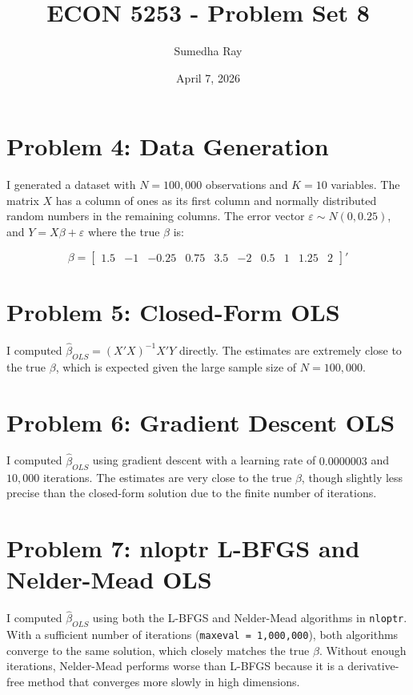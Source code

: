 \documentclass{article}
\title{ECON 5253 - Problem Set 8}
\author{Sumedha Ray}
\date{April 7, 2026}
\begin{document}
\maketitle

\section*{Problem 4: Data Generation}

I generated a dataset with $N = 100{,}000$ observations and $K = 10$ variables. The matrix $X$ has a column of ones as its first column and normally distributed random numbers in the remaining columns. The error vector $\varepsilon \sim N(0, 0.25)$, and $Y = X\beta + \varepsilon$ where the true $\beta$ is:

\[
\beta = \begin{bmatrix} 1.5 & -1 & -0.25 & 0.75 & 3.5 & -2 & 0.5 & 1 & 1.25 & 2 \end{bmatrix}'
\]

\section*{Problem 5: Closed-Form OLS}

I computed $\hat{\beta}_{OLS} = (X'X)^{-1}X'Y$ directly. The estimates are extremely close to the true $\beta$, which is expected given the large sample size of $N = 100{,}000$.

\section*{Problem 6: Gradient Descent OLS}

I computed $\hat{\beta}_{OLS}$ using gradient descent with a learning rate of $0.0000003$ and $10{,}000$ iterations. The estimates are very close to the true $\beta$, though slightly less precise than the closed-form solution due to the finite number of iterations.

\section*{Problem 7: nloptr L-BFGS and Nelder-Mead OLS}

I computed $\hat{\beta}_{OLS}$ using both the L-BFGS and Nelder-Mead algorithms in \texttt{nloptr}. With a sufficient number of iterations (\texttt{maxeval = 1,000,000}), both algorithms converge to the same solution, which closely matches the true $\beta$. Without enough iterations, Nelder-Mead performs worse than L-BFGS because it is a derivative-free method that converges more slowly in high dimensions.
\end{document}

